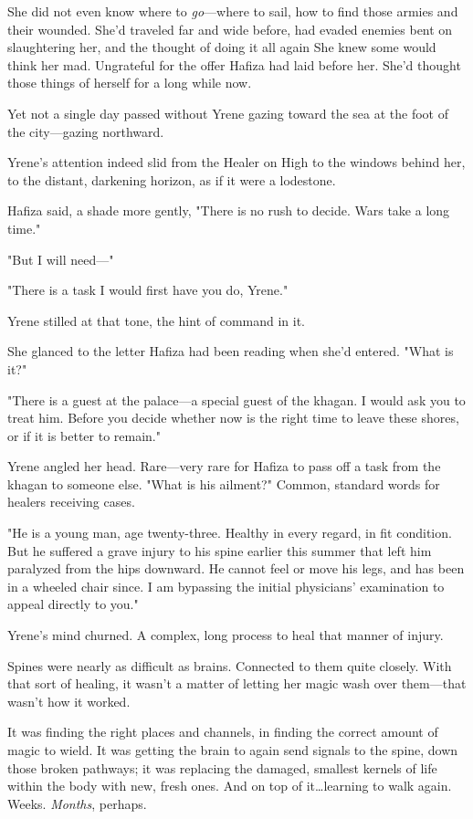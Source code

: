 She did not even know where to \emph{go}---where to sail, how to find those armies and their wounded. She'd traveled far and wide before, had evaded enemies bent on slaughtering her, and the thought of doing it all again  She knew some would think her mad. Ungrateful for the offer Hafiza had laid before her. She'd thought those things of herself for a long while now.

Yet not a single day passed without Yrene gazing toward the sea at the foot of the city---gazing northward.

Yrene's attention indeed slid from the Healer on High to the windows behind her, to the distant, darkening horizon, as if it were a lodestone.

Hafiza said, a shade more gently, "There is no rush to decide. Wars take a long time."

"But I will need---"

"There is a task I would first have you do, Yrene."

Yrene stilled at that tone, the hint of command in it.

She glanced to the letter Hafiza had been reading when she'd entered. "What is it?"

"There is a guest at the palace---a special guest of the khagan. I would ask you to treat him. Before you decide whether now is the right time to leave these shores, or if it is better to remain."

Yrene angled her head. Rare---very rare for Hafiza to pass off a task from the khagan to someone else. "What is his ailment?" Common, standard words for healers receiving cases.

"He is a young man, age twenty-three. Healthy in every regard, in fit condition. But he suffered a grave injury to his spine earlier this summer that left him paralyzed from the hips downward. He cannot feel or move his legs, and has been in a wheeled chair since. I am bypassing the initial physicians' examination to appeal directly to you."

Yrene's mind churned. A complex, long process to heal that manner of injury.

Spines were nearly as difficult as brains. Connected to them quite closely. With that sort of healing, it wasn't a matter of letting her magic wash over them---that wasn't how it worked.

It was finding the right places and channels, in finding the correct amount of magic to wield. It was getting the brain to again send signals to the spine, down those broken pathways; it was replacing the damaged, smallest kernels of life within the body with new, fresh ones. And on top of it\ldots learning to walk again. Weeks. \emph{Months}, perhaps.

